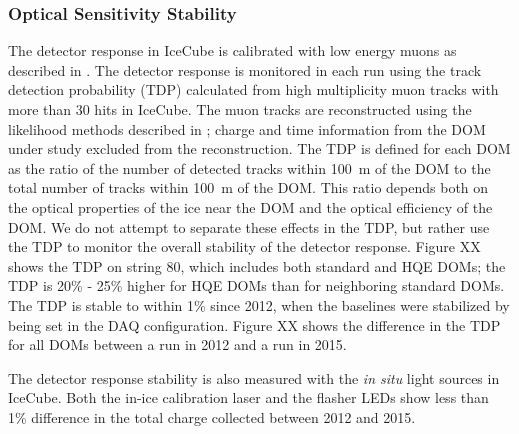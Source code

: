 \subsubsection{Optical Sensitivity Stability}

The detector response in IceCube is calibrated with low energy muons as
described in \cite{IC3:ereco}. The detector response is monitored in each run using the track
detection probability (TDP) calculated from high
multiplicity muon tracks with more than 30 hits in IceCube. The muon
tracks are reconstructed using the likelihood methods described in
\cite{IC3:ereco}; charge and time information from the DOM under study excluded
from the reconstruction. The TDP is
defined for each DOM as the ratio of the number of detected tracks
within 100~m of the DOM to the total number of tracks within 100~m of
the DOM. This ratio depends both on the optical properties of the ice
near the DOM and the optical efficiency of the DOM. We do not attempt
to separate
these effects in the TDP, but rather use the TDP to monitor the
overall stability of the detector response. Figure XX shows the TDP on
string 80, which includes both standard and HQE DOMs; the TDP is
20\% - 25\% higher for HQE DOMs than for neighboring standard
DOMs. The TDP is stable to within 1\% since 2012, when the baselines
were stabilized by being set in the DAQ configuration. Figure XX shows
the difference in the TDP for all DOMs between a run in 2012 and a run
in 2015.

The detector response stability is also measured with the {\it in
  situ} light sources in IceCube. Both the in-ice calibration laser
\cite{IC3:SC} and the flasher LEDs show less than 1\% difference in the total
charge collected between 2012 and 2015. 

%
%





